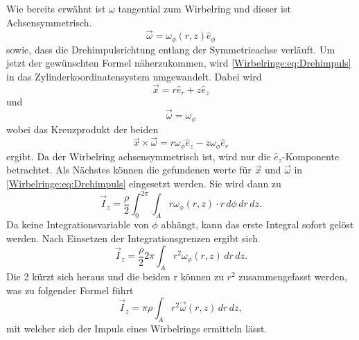 Wie bereits erwähnt ist $\omega$ tangential zum Wirbelring und dieser ist Achsensymmetrisch.
\begin{equation*}
    \vec{\omega}
    =
    \omega_\phi(r,z)\hat{e}_\phi
\end{equation*}
sowie, dass die Drehimpulsrichtung entlang der Symmetrieachse verläuft.
Um jetzt der gewünschten Formel näherzukommen, wird \eqref{Wirbelringe:eq:Drehimpuls} in das Zylinderkoordinatensystem umgewandelt.
Dabei wird
\begin{equation*}
    \vec{x}
    =
    r\hat{e}_r + z\hat{e}_z
\end{equation*}
und
\begin{equation*}
    \vec{\omega}
    =
    \omega_\phi
\end{equation*}
wobei das Kreuzprodukt der beiden 
\begin{equation*}
    \vec{x}\times\vec{\omega}
    =
    r\omega_\phi\hat{e}_z - z\omega_\phi\hat{e}_r
\end{equation*}
ergibt. Da der Wirbelring achsensymmetrisch ist, wird nur die $\hat{e}_z$-Komponente betrachtet.
Als Nächstes können die gefundenen werte für $\vec{x}$ und $\vec{\omega}$ in \eqref{Wirbelringe:eq:Drehimpuls} eingesetzt werden.
Sie wird dann zu
\begin{equation*}
    \vec{I}_z
    =
    \frac{\rho}{2}\int_{0}^{2\pi}\int_{A}r\omega_\phi(r,z)\cdot r\,d\phi \,dr\,dz.
\end{equation*}
Da keine Integrationsvariable von $\phi$ abhängt, kann das erste Integral sofort gelöst werden. Nach Einsetzen der Integrationsgrenzen ergibt sich
\begin{equation*}
    \vec{I}_z
    =
    \frac{\rho}{2}2\pi\int_{A}r^2\omega_\phi(r,z)\,dr\,dz.
\end{equation*}
Die 2 kürzt sich heraus und die beiden r können zu $r^2$ zusammengefasst werden, was zu folgender Formel führt
\begin{equation}
    \vec{I}_z
    =
    \pi\rho\int_{A}r^2\vec{\omega}(r,z)\,dr\,dz
    \label{Wirbelringe:eq:achssymImp},
\end{equation}
mit welcher sich der Impuls eines Wirbelrings ermitteln lässt.

